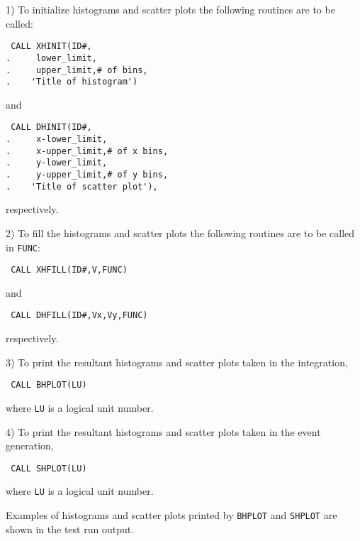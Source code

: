 {\small\begin{description}
\item{1)} To initialize histograms and scatter plots the following routines are
to be called:
\begin{verbatim}
 CALL XHINIT(ID#,
.     lower_limit,
.     upper_limit,# of bins, 
.    'Title of histogram')
\end{verbatim}
and
\begin{verbatim}
 CALL DHINIT(ID#,
.     x-lower_limit,
.     x-upper_limit,# of x bins,
.     y-lower_limit,
.     y-upper_limit,# of y bins,
.    'Title of scatter plot'),
\end{verbatim}
respectively.
\item{2)} To fill the histograms and scatter plots the following routines are to be
called in {\tt FUNC}:
\begin{verbatim}
 CALL XHFILL(ID#,V,FUNC)
\end{verbatim}
and
\begin{verbatim}
 CALL DHFILL(ID#,Vx,Vy,FUNC)
\end{verbatim}
respectively.
\item{3)} To print the resultant histograms and scatter plots taken in the
integration,
\begin{verbatim}
 CALL BHPLOT(LU)
\end{verbatim}
\noindent
where {\tt LU} is a logical unit number.
\item{4)} To print the resultant histograms and scatter plots taken in the
event generation,
\begin{verbatim}
 CALL SHPLOT(LU)
\end{verbatim}
\noindent
where {\tt LU} is a logical unit number.
\end{description}}
\par\noindent
Examples of histograms and scatter plots printed by {\tt BHPLOT} and {\tt SHPLOT}
are shown in the test run output.
